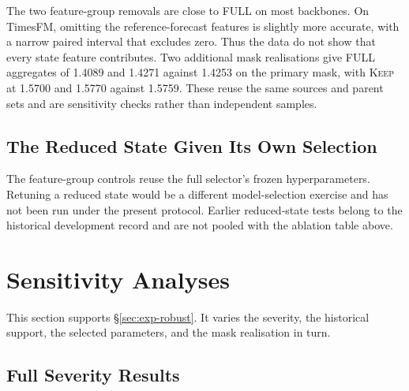 \documentclass{article}
\begin{document}
The two feature-group removals are close to FULL on most backbones. On TimesFM, omitting the
reference-forecast features is slightly more accurate, with a narrow paired interval that
excludes zero. Thus the data do not show that every state feature contributes. Two additional
mask realisations give FULL aggregates of 1.4089 and 1.4271 against 1.4253 on the primary
mask, with \textsc{Keep} at 1.5700 and 1.5770 against 1.5759. These reuse the same sources
and parent sets and are sensitivity checks rather than independent samples.

\subsection{The Reduced State Given Its Own Selection}
\label{app:compact-selection}
The feature-group controls reuse the full selector's frozen hyperparameters. Retuning a
reduced state would be a different model-selection exercise and has not been run under the
present protocol. Earlier reduced-state tests belong to the historical development record
and are not pooled with the ablation table above.

\section{Sensitivity Analyses}

This section supports \S\ref{sec:exp-robust}. It varies the severity, the historical
support, the selected parameters, and the mask realisation in turn.

\subsection{Full Severity Results}
\label{app:severity-full}
\end{document}

